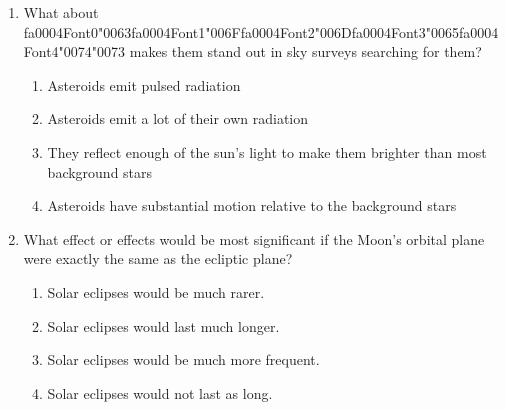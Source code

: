 \documentclass[12pt]{article}
\begin{document}
\begin{enumerate}[label=\arabic*.]
\begin{enumerate}[label=(\alph*)]
    \item Magnetite grains similar to those formed by bacteria on Earth
    \item Carbonate minerals indicating a thicker warmer Martian atmosphere
    \item Amino acids with a preferred orientation or "chirality"
\end{enumerate}
\item What about {\csname fa0004Font0\endcsname\char"0063}{\csname fa0004Font1\endcsname\char"006F}{\csname fa0004Font2\endcsname\char"006D}{\csname fa0004Font3\endcsname\char"0065}{\csname fa0004Font4\endcsname\char"0074}{\char"0073} makes them stand out in sky surveys searching for them?
\begin{enumerate}[label=(\alph*)]
    \item Asteroids emit pulsed radiation
    \item Asteroids emit a lot of their own radiation
    \item They reflect enough of the sun's light to make them brighter than most background stars
    \item Asteroids have substantial motion relative to the background stars
\end{enumerate}
\item What effect or effects would be most significant if the Moon's orbital plane were exactly
the same as the ecliptic plane?
\begin{enumerate}[label=(\alph*)]
    \item Solar eclipses would be much rarer.
    \item Solar eclipses would last much longer.
    \item Solar eclipses would be much more frequent.
    \item Solar eclipses would not last as long.
\end{enumerate}
\end{enumerate}
\end{document}
